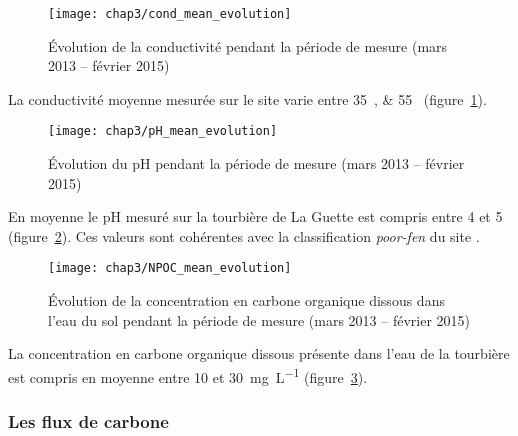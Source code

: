 \begin{figure}
\centering
\texttt{[image: chap3/cond\_mean\_evolution]}
\caption{Évolution de la conductivité pendant la période de mesure (mars 2013 -- février 2015)}
\label{fig:cond_mean_evolution}
\end{figure}

La conductivité moyenne mesurée sur le site varie entre \SIlist{35;55}{\usml} (figure~\ref{fig:cond_mean_evolution}).


\begin{figure}
\centering
\texttt{[image: chap3/pH\_mean\_evolution]}
\caption{Évolution du pH pendant la période de mesure (mars 2013 -- février 2015)}
\label{fig:pH_mean_evolution}
\end{figure}


En moyenne le pH mesuré sur la tourbière de La Guette est compris entre 4 et 5 (figure~\ref{fig:pH_mean_evolution}).
Ces valeurs sont cohérentes avec la classification \textit{poor-fen} du site .



\begin{figure}
\centering
\texttt{[image: chap3/NPOC\_mean\_evolution]}
\caption{Évolution de la concentration en carbone organique dissous dans l'eau du sol pendant la période de mesure (mars 2013 -- février 2015)}
\label{fig:NPOC_mean_evolution}
\end{figure}

La concentration en carbone organique dissous présente dans l'eau de la tourbière est compris en moyenne entre \num{10} et \SI{30}{\milli\gram\per\liter} (figure~\ref{fig:NPOC_mean_evolution}).


\subsubsection{Les flux de carbone}

